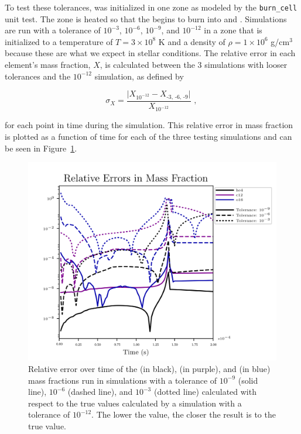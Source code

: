 \documentclass[preprint]{aastex62}
\begin{document}
      To test these tolerances,  was initialized in one zone as modeled by the {\tt burn\_cell} unit test. The zone is heated so that the  begins to burn into  and . Simulations are run with a tolerance of $10^{-3}$, $10^{-6}$, $10^{-9}$, and $10^{-12}$ in a zone that is initialized to a temperature of $T = 3 \times 10^8$ K and a density of $\rho = 1 \times 10^6$ g/cm$^3$ because these are what we expect in stellar conditions. The relative error in each element's mass fraction, $X$, is calculated between the 3 simulations with looser tolerances and the $10^{-12}$ simulation, as defined by 
    
      \begin{equation}
        \sigma_X = \frac{\lvert X_{10^{-12}} - X_{\text{-3, -6, -9}} \rvert }{X_{10^{-12}}} \text{    , }
        \label{eq:relativeerror}
      \end{equation}
    
      \noindent for each point in time during the simulation. This relative error in mass fraction is plotted as a function of time for each of the three testing simulations and can be seen in Figure~\ref{fig:relativeerror}.
    
      \begin{figure}
        \centering
        \includegraphics[width=5in]{images/react_aprox13_test13_ureca_tol-rel_xn1.png}
        \caption{Relative error over time of the  (in black),  (in purple), and  (in blue) mass fractions run in simulations with a tolerance of $10^{-9}$ (solid line), $10^{-6}$ (dashed line), and $10^{-3}$ (dotted line) calculated with respect to the true values calculated by a simulation with a tolerance of $10^{-12}$. The lower the value, the closer the result is to the true value.
          }
        \label{fig:relativeerror}
      \end{figure}  
  
\end{document}

